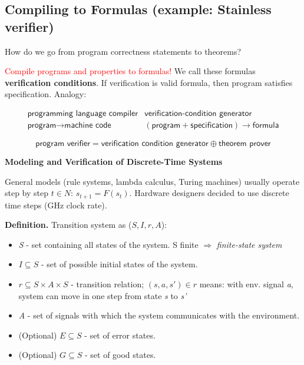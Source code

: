 \documentclass[11pt]{article}
\begin{document}
\subsection*{Compiling to Formulas (example: Stainless verifier)}

How do we go from program correctness statements to theorems? 

\textcolor{red}{Compile programs and properties to formulas!}
We call these formulas \textbf{verification conditions}. If verification is valid formula, then program satisfies specification. Analogy:

\[
\begin{array}{c|c}
\textsf{programming language compiler} & \textsf{verification-condition generator} \\
\hline
\textsf{program} \rightarrow \textsf{machine code} & (\textsf{program} + \textsf{specification}) \rightarrow \textsf{formula}
\end{array}
\]

\vspace{0.5cm}

\[
\boxed{\textsf{program verifier}} = \boxed{\textsf{verification condition generator}} \oplus \boxed{\textsf{theorem prover}}
\]

\vspace{0.5cm}

\begin{center}
  {\LARGE \textbf{Modeling and Verification of Discrete-Time Systems}}
\end{center}
\vspace{0.5cm}

General models (rule systems, lambda calculus, Turing machines) usually  operate step by step $t \in N: \,  s_{t+1} = F(s_t)$. Hardware designers decided to use discrete time steps (GHz clock rate). 

\begin{tcolorbox}[
    enhanced,
    frame hidden,
    borderline west={2pt}{0pt}{black},
    boxsep=5pt,
    left=8pt
]
\textbf{Definition.} Transition system as ($S, I, r, A$):
\begin{itemize}
	\item \textit{S} - set containing all states of the system. S finite $\Rightarrow$ \textit{finite-state system}
	\item $I \subseteq S$ - set of possible initial states of the system.
	\item $r \subseteq S \times A \times S$ - transition relation; $(s, a, s') \in r$ means: with env. signal \textit{a}, system can move in one step from state \textit{s} to \textit{s'}
	\item \textit{A} - set of signals with which the system communicates with the environment. 
	\item (Optional) $E \subseteq S$ - set of error states. 
	\item (Optional) $G \subseteq S$ - set of good states. 
\end{itemize}
\end{tcolorbox}
\end{document}
